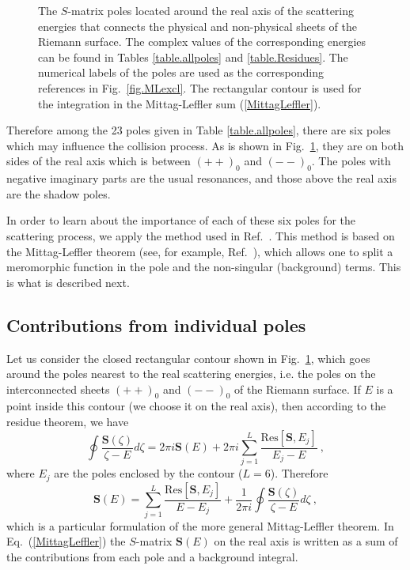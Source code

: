 \documentclass[12pt]{article}
\begin{document}
\begin{figure}
\centerline{}
\caption{\sf
The $S$-matrix poles located around the real axis of the scattering energies
that connects the physical and non-physical sheets of the Riemann surface.
The complex values of the corresponding energies can be found in
Tables \ref{table.allpoles} and \ref{table.Residues}. The numerical labels of
the poles are used as the corresponding references in Fig.~\ref{fig.MLexcl}.
The rectangular contour is used for the integration in the Mittag-Leffler sum
(\ref{MittagLeffler}).
}
\label{fig.6poles}
\end{figure}

Therefore among the 23 poles given in Table \ref{table.allpoles}, there are
six poles which may influence the collision process. As is
shown in Fig.~\ref{fig.6poles}, they are on both sides of the real axis
which is between $(++)_0$ and $(--)_0$.
The poles with negative imaginary parts are the usual resonances, and those
above the real axis are the shadow poles.

In order to learn about the importance of each of these six poles for the
scattering process, we apply the method used in Ref.~\cite{our_J.Q.Chem.}. This
method is based on the Mittag-Leffler theorem (see, for example,
Ref.~\cite{MLbook}), which allows one to split a meromorphic function in the
pole and the non-singular (background) terms. This is what is described next.


\subsection{Contributions from individual poles}
\label{sec.Mittag-Leffler}
Let us consider the closed rectangular contour shown in Fig.~\ref{fig.6poles},
which goes around the poles nearest to the real scattering energies, i.e. the 
poles on the interconnected sheets $(++)_0$ and $(--)_0$ of the Riemann 
surface.
If $E$ is a point inside this contour (we choose it on the real axis), then
according to the residue theorem, we have
\begin{equation}
\label{Res_theorem}
   \oint\frac{\bm{S}(\zeta)}{\zeta-E}d\zeta=
   2\pi i\bm{S}(E)+2\pi i\sum_{j=1}^L
   \frac{\mathrm{Res}[\bm{S},E_j]}{E_j-E}\ ,
\end{equation}
where $E_j$ are the poles enclosed by the contour ($L=6$). Therefore
\begin{equation}
\label{MittagLeffler}
   \bm{S}(E)=\sum_{j=1}^L
   \frac{\mathrm{Res}[\bm{S},E_j]}{E-E_j}+
   \frac{1}{2\pi i}\oint\frac{\bm{S}(\zeta)}{\zeta-E}d\zeta\ ,
\end{equation}
which is a particular formulation of the more general Mittag-Leffler theorem.
In Eq.~(\ref{MittagLeffler}) the $S$-matrix $\bm{S}(E)$ on the real axis is
written as a sum of the contributions from each pole and a background integral.
\end{document}
